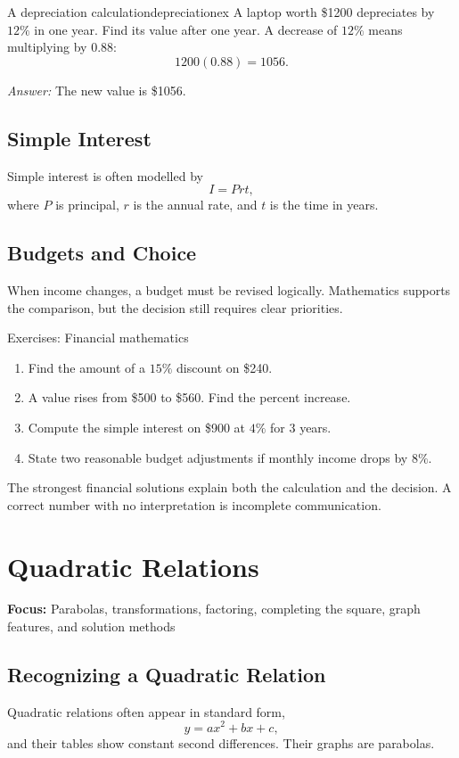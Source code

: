 \documentclass[11pt,oneside]{book}
\newcommand{\topicline}[1]{\medskip\noindent\textbf{Focus:} #1\par\medskip}
\newcommand{\answerline}{\par\smallskip\noindent\textit{Answer: }}
\begin{document}
\begin{example}{A depreciation calculation}{depreciationex}
A laptop worth \$1200 depreciates by $12\%$ in one year. Find its value after one year.
\tcblower
A decrease of $12\%$ means multiplying by $0.88$:
\[
1200(0.88)=1056.
\]
\answerline The new value is \$1056.
\end{example}

\section{Simple Interest}
Simple interest is often modelled by
\[
I=Prt,
\]
where $P$ is principal, $r$ is the annual rate, and $t$ is the time in years.

\section{Budgets and Choice}
When income changes, a budget must be revised logically. Mathematics supports the comparison, but the decision still requires clear priorities.

\begin{exercisebox}{Exercises: Financial mathematics}
\begin{enumerate}
  \item Find the amount of a $15\%$ discount on \$240.
  \item A value rises from \$500 to \$560. Find the percent increase.
  \item Compute the simple interest on \$900 at $4\%$ for $3$ years.
  \item State two reasonable budget adjustments if monthly income drops by $8\%$.
\end{enumerate}
\end{exercisebox}

\begin{summarybox}
The strongest financial solutions explain both the calculation and the decision. A correct number with no interpretation is incomplete communication.
\end{summarybox}

\chapter{Quadratic Relations}
\topicline{Parabolas, transformations, factoring, completing the square, graph features, and solution methods}

\section{Recognizing a Quadratic Relation}
Quadratic relations often appear in standard form,
\[
y=ax^2+bx+c,
\]
and their tables show constant second differences. Their graphs are parabolas.
\end{document}
